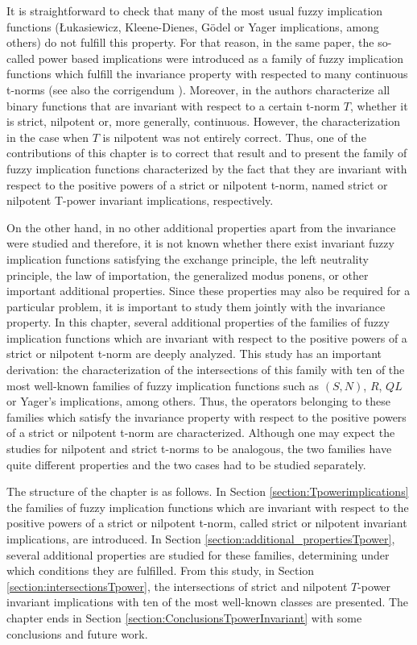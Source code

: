 It is straightforward to check that many of the most usual fuzzy implication functions (\L ukasiewicz, Kleene-Dienes, G\"odel or Yager implications, among others) do not fulfill this property. For that reason, in the same paper, the so-called power based implications were introduced as a family of fuzzy implication functions which fulfill the invariance property with respected to many continuous t-norms (see also the corrigendum \cite{Massanet2019}). Moreover, in \cite{Massanet2019B} the authors characterize all binary functions that are invariant with respect to a certain t-norm $T$, whether it is strict, nilpotent or, more generally, continuous. However, the characterization in the case when $T$ is nilpotent was not entirely correct. Thus, one of the contributions of this chapter is to correct that result and to present the family of fuzzy implication functions characterized by the fact that they are invariant with respect to the positive powers of a strict or nilpotent t-norm, named strict or nilpotent T-power invariant implications, respectively.


 On the other hand, in \cite{Massanet2019B} no other additional properties apart from the invariance were studied and therefore, it is not known whether there exist invariant fuzzy implication functions  satisfying the exchange principle, the left neutrality principle, the law of importation, the generalized modus ponens, or other important additional properties. Since these properties may also be required for a particular problem, it is important to study them jointly with the invariance property. In this chapter, several additional properties of the families of fuzzy implication functions which are invariant with respect to the positive powers of a strict or nilpotent t-norm are deeply analyzed. This study has an important derivation: the characterization of the intersections of this family with ten of the most well-known families of fuzzy implication functions such as $(S,N)$, $R$, $QL$ or Yager's implications, among others. Thus, the operators belonging to these families which satisfy the invariance property with respect to the positive powers of a strict or nilpotent t-norm are characterized. Although one may expect the studies for nilpotent and strict t-norms to be analogous, the two families have quite different properties and the two cases had to be studied separately.


The structure of the chapter is as follows. In Section \ref{section:Tpowerimplications} the families of fuzzy implication functions which are invariant with respect to the positive powers of a strict or nilpotent t-norm, called strict or nilpotent invariant implications, are introduced. In Section \ref{section:additional_propertiesTpower}, several additional properties are studied for these families, determining under which conditions they are fulfilled. From this study, in Section \ref{section:intersectionsTpower}, the intersections of strict and nilpotent $T$-power invariant implications with ten of the most well-known classes are presented. The chapter ends in Section \ref{section:ConclusionsTpowerInvariant} with some conclusions and future work. 

